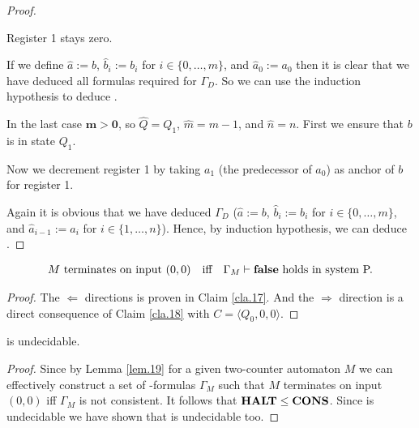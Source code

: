 \begin{proof}
	\begin{figure}[H]
		\centering
		
	\end{figure}
	
	Register 1 stays zero.
	
	\begin{figure}[H]
		\centering
		
	\end{figure}
	
	If we define $\widehat{a}:=b$, $\widehat{b}_i:=b_i$ for $i\in\{0,\dots,m\}$, and $\widehat{a}_0:=a_0$ then it is clear that we have deduced all formulas required for $\Gamma_D$. So we can use the induction hypothesis to deduce \false{}.
	
	In the last case $\boldsymbol{m>0}$, so $\widehat{Q}=Q_1$, $\widehat{m}=m-1$, and $\widehat{n}=n$. First we ensure that $b$ is in state $Q_1$.
	
	\begin{figure}[H]
		\centering
		
	\end{figure}
	
	Now we decrement register 1 by taking $a_1$ (the predecessor of $a_0$) as anchor of $b$ for register 1.
	
	\begin{figure}[H]
		\centering
		
	\end{figure}
	
	Again it is obvious that we have deduced $\Gamma_D$ ($\widehat{a}:=b$, $\widehat{b}_i:=b_i$ for $i\in\{0,\dots,m\}$, and $\widehat{a}_{i-1}:=a_i$ for $i\in\{1,\dots,n\}$). Hence, by induction hypothesis, we can deduce \false{}.
\end{proof}

\begin{lemma}\label{lem.19}
	\begin{align*} %
		  & \text{$M$ terminates on input $(0,0)$} &   & \text{iff} & \text{$\Gamma_M\PModels\false$ holds in system P.} 
	\end{align*}
\end{lemma}
\begin{proof}
	The $\Leftarrow$ directions is proven in Claim \ref{cla.17}. And the $\Rightarrow$ direction is a direct consequence of Claim \ref{cla.18} with $C=\langle Q_0,0,0\rangle$.
\end{proof}

\begin{theorem}
	\PCons{} is undecidable.
\end{theorem}
\begin{proof}
	Since by Lemma \ref{lem.19} for a given two-counter automaton $M$ we can effectively construct a set of \SysP-formulas $\Gamma_M$ such that $M$ terminates on input $(0,0)$ iff $\Gamma_M$ is not consistent. It follows that $\textbf{HALT}\leq\textbf{CONS}$. Since \autHalt{} is undecidable we have shown that \PCons{} is undecidable too.
\end{proof}
